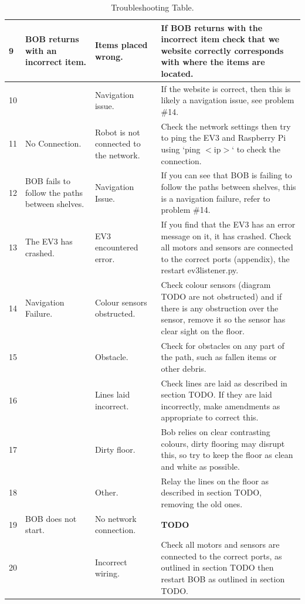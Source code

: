 \documentclass[onecolumn]{IEEEtran}
\begin{document}
\begin{table}[H]
\begin{tabular}{ | m{0.4cm} | m{3.5cm} | m{3.5cm} | m{10cm} | }
    \\ \hline
    9 & BOB returns with an incorrect item. & Items placed wrong. & If BOB returns with the incorrect item check that we website correctly corresponds with where the items are located.
    \\ \hline
    10 &  & Navigation issue. & If the website is correct, then this is likely a navigation issue, see problem \#14.
    \\ \hline
    11 & No Connection. & Robot is not connected to the network. & Check the network settings then try to ping the EV3 and Raspberry Pi using `ping $<$ip$>$` to check the connection.
    \\ \hline
    12 & BOB fails to follow the paths between shelves. & Navigation Issue. & If you can see that BOB is failing to follow the paths between shelves, this is a navigation failure, refer to problem \#14.
    \\ \hline 
    13 & The EV3 has crashed. & EV3 encountered error. & If you find that the EV3 has an error message on it, it has crashed. Check all motors and sensors are connected to the correct ports (appendix), the restart ev3listener.py.
    \\ \hline
    14 & Navigation Failure. & Colour sensors obstructed. & Check colour sensors (diagram TODO are not obstructed) and if there is any obstruction over the sensor, remove it so the sensor has clear sight on the floor.
    \\ \hline
    15 &  & Obstacle. & Check for obstacles on any part of the path, such as fallen items or other debris.
    \\ \hline
    16 &  & Lines laid incorrect. & Check lines are laid as described in section TODO. If they are laid incorrectly, make amendments as appropriate to correct this.
    \\ \hline
    17 &  & Dirty floor. & Bob relies on clear contrasting colours, dirty flooring may disrupt this, so try to keep the floor as clean and white as possible.
    \\ \hline
    18 &  & Other. & Relay the lines on the floor as described in section TODO, removing the old ones.
    \\ \hline
    19 & BOB does not start. & No network connection. & \textbf{TODO}
    \\ \hline
    20 &  & Incorrect wiring. & Check all motors and sensors are connected to the correct ports, as outlined in section TODO then restart BOB as outlined in section TODO.
    \\ \hline
  \end{tabular}
  \caption{Troubleshooting Table.}\label{tbl:myLboro}
\end{table}
\end{document}
